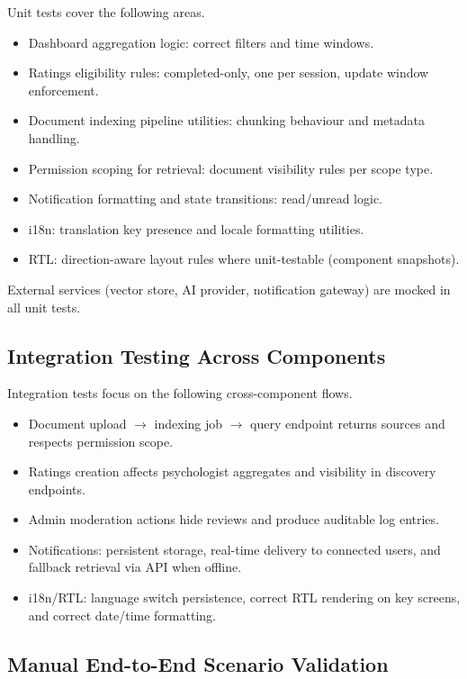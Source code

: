 \documentclass[a4paper,12pt]{report}
\begin{document}
Unit tests cover the following areas.

\begin{itemize}[leftmargin=*]
  \item[--] Dashboard aggregation logic: correct filters and time windows.
  \item[--] Ratings eligibility rules: completed-only, one per session, update window enforcement.
  \item[--] Document indexing pipeline utilities: chunking behaviour and metadata handling.
  \item[--] Permission scoping for retrieval: document visibility rules per scope type.
  \item[--] Notification formatting and state transitions: read/unread logic.
  \item[--] i18n: translation key presence and locale formatting utilities.
  \item[--] RTL: direction-aware layout rules where unit-testable (component snapshots).
\end{itemize}

External services (vector store, AI provider, notification gateway) are mocked in all unit
tests.

\subsection{Integration Testing Across Components}

Integration tests focus on the following cross-component flows.

\begin{itemize}[leftmargin=*]
  \item[--] Document upload $\rightarrow$ indexing job $\rightarrow$ query endpoint returns
        sources and respects permission scope.
  \item[--] Ratings creation affects psychologist aggregates and visibility in discovery
        endpoints.
  \item[--] Admin moderation actions hide reviews and produce auditable log entries.
  \item[--] Notifications: persistent storage, real-time delivery to connected users, and
        fallback retrieval via API when offline.
  \item[--] i18n/RTL: language switch persistence, correct RTL rendering on key screens, and
        correct date/time formatting.
\end{itemize}
\clearpage
\subsection{Manual End-to-End Scenario Validation}
\end{document}
